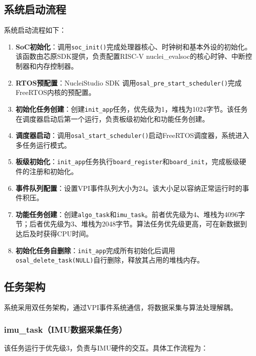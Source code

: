 \documentclass[lettersize,journal]{IEEEtran}
\begin{document}
\subsection{系统启动流程}

系统启动流程如下：

\begin{enumerate}[leftmargin=*]
    \item \textbf{SoC初始化}：调用\texttt{soc\_init()}完成处理器核心、时钟树和基本外设的初始化。该函数由芯原SDK提供，负责配置RISC-V nuclei\_evalsoc的核心时钟、中断控制器和内存控制器。
    \item \textbf{RTOS预配置}：NucleiStudio SDK 调用\texttt{osal\_pre\_start\_scheduler()}完成FreeRTOS内核的预配置。
    \item \textbf{初始化任务创建}：创建\texttt{init\_app}任务，优先级为1，堆栈为1024字节。该任务在调度器启动后第一个运行，负责板级初始化和功能任务创建。
    \item \textbf{调度器启动}：调用\texttt{osal\_start\_scheduler()}启动FreeRTOS调度器，系统进入多任务运行模式。
    \item \textbf{板级初始化}：\texttt{init\_app}任务执行\texttt{board\_register}和\texttt{board\_init}，完成板级硬件的注册和初始化。
    \item \textbf{事件队列配置}：设置VPI事件队列大小为24。该大小足以容纳正常运行时的事件积压。
    \item \textbf{功能任务创建}：创建\texttt{algo\_task}和\texttt{imu\_task}。前者优先级为4、堆栈为4096字节；后者优先级为3、堆栈为2048字节。算法任务优先级更高，可在新数据到达后及时获得CPU时间。
    \item \textbf{初始化任务自删除}：\texttt{init\_app}完成所有初始化后调用\texttt{osal\_delete\_task(NULL)}自行删除，释放其占用的堆栈内存。
\end{enumerate}

\subsection{任务架构}

系统采用双任务架构，通过VPI事件系统通信，将数据采集与算法处理解耦。

\subsubsection{imu\_task（IMU数据采集任务）}

该任务运行于优先级3，负责与IMU硬件的交互。具体工作流程为：
\end{document}
